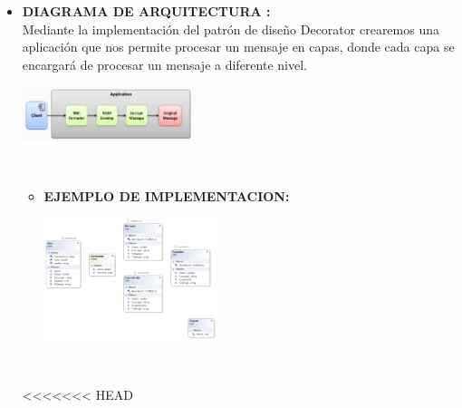 \documentclass[twoside,twocolumn]{article}
\begin{document}
\begin{itemize}
\begin{itemize}
	\item \textbf{DIAGRAMA DE ARQUITECTURA :}	\\
        Mediante la implementación del patrón de diseño Decorator crearemos una aplicación que nos permite procesar un mensaje en capas, donde cada capa se encargará de procesar un mensaje a diferente nivel.
        
        \begin{center}
            \includegraphics[width=5cm]{./img/Imagen7.png} 
        \end{center}
        \\

        \begin{itemize}
        \item \textbf{EJEMPLO DE IMPLEMENTACION:}	
        
        \begin{center}
            \includegraphics[width=5cm]{./img/Imagen8.png} 
        \end{center}
        \\

        \end{itemize} 

<<<<<<< HEAD
        

\end{itemize}
\end{itemize}
\end{document}
